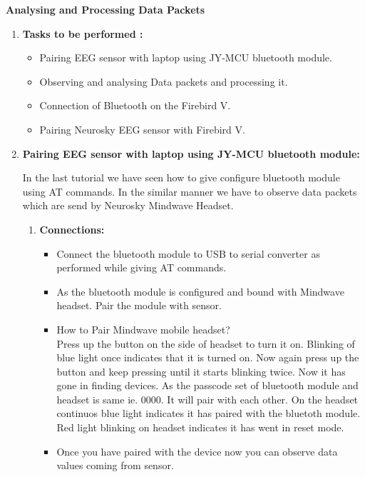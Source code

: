\documentclass[12pt]{article}
\author{Omkar Mohite}
\title{}
\begin{document}
\begin{center}
\textbf{{\LARGE Analysing and Processing Data Packets }}
\end{center}

\begin{enumerate}
	\item \textbf{{\large Tasks to be performed :}}
	\begin{itemize}
	\item Pairing EEG sensor with laptop using JY-MCU bluetooth module.
	\item Observing and analysing Data packets and processing it.
	\item Connection of Bluetooth on the Firebird V.
	\item Pairing Neurosky EEG sensor with Firebird V.
	\end{itemize}



	\item \textbf{{\large Pairing EEG sensor with laptop using JY-MCU bluetooth module:}}


In the last tutorial we have seen how to give configure bluetooth module using
AT commands. In the similar manner we have to observe data packets which are send
by Neurosky Mindwave Headset.

\begin{enumerate}
\item \textbf{Connections:}

\begin{itemize}
	\item Connect the bluetooth module to USB to serial converter as performed while giving AT commands.
	\item As the bluetooth module is configured and bound with Mindwave headset. Pair the module with sensor.
	\item How to Pair Mindwave mobile headset?\\
	Press up the button on the side of headset to turn it on. Blinking of blue light once indicates that it is turned on. Now again press up the button and keep pressing until it starts blinking twice. Now it has gone in finding devices. As the passcode set of bluetooth module and headset is same ie. 0000. It will pair with each other. On the headset continuos blue light indicates it has paired with the bluetoth module. Red light blinking on headset indicates it has went in reset mode.
	

	\item Once you have paired with the device now you can observe data values coming from sensor.
\end{itemize}
\end{enumerate}



\end{enumerate}
\end{document}

